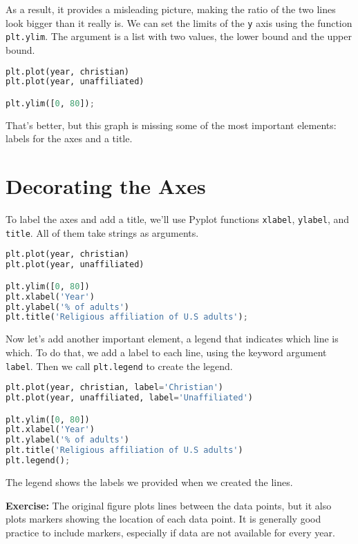 As a result, it provides a misleading picture, making the ratio of the
two lines look bigger than it really is. We can set the limits of the
\passthrough{\lstinline!y!} axis using the function
\passthrough{\lstinline!plt.ylim!}. The argument is a list with two
values, the lower bound and the upper bound.

\begin{lstlisting}[language=Python,style=source]
plt.plot(year, christian)
plt.plot(year, unaffiliated)

plt.ylim([0, 80]);
\end{lstlisting}

That's better, but this graph is missing some of the most important
elements: labels for the axes and a title.

\hypertarget{decorating-the-axes}{%
\section{Decorating the Axes}\label{decorating-the-axes}}

To label the axes and add a title, we'll use Pyplot functions
\passthrough{\lstinline!xlabel!}, \passthrough{\lstinline!ylabel!}, and
\passthrough{\lstinline!title!}. All of them take strings as arguments.

\begin{lstlisting}[language=Python,style=source]
plt.plot(year, christian)
plt.plot(year, unaffiliated)

plt.ylim([0, 80])
plt.xlabel('Year')
plt.ylabel('% of adults')
plt.title('Religious affiliation of U.S adults');
\end{lstlisting}

Now let's add another important element, a legend that indicates which
line is which. To do that, we add a label to each line, using the
keyword argument \passthrough{\lstinline!label!}. Then we call
\passthrough{\lstinline!plt.legend!} to create the legend.

\begin{lstlisting}[language=Python,style=source]
plt.plot(year, christian, label='Christian')
plt.plot(year, unaffiliated, label='Unaffiliated')

plt.ylim([0, 80])
plt.xlabel('Year')
plt.ylabel('% of adults')
plt.title('Religious affiliation of U.S adults')
plt.legend();
\end{lstlisting}

The legend shows the labels we provided when we created the lines.

\textbf{Exercise:} The original figure plots lines between the data
points, but it also plots markers showing the location of each data
point. It is generally good practice to include markers, especially if
data are not available for every year.

